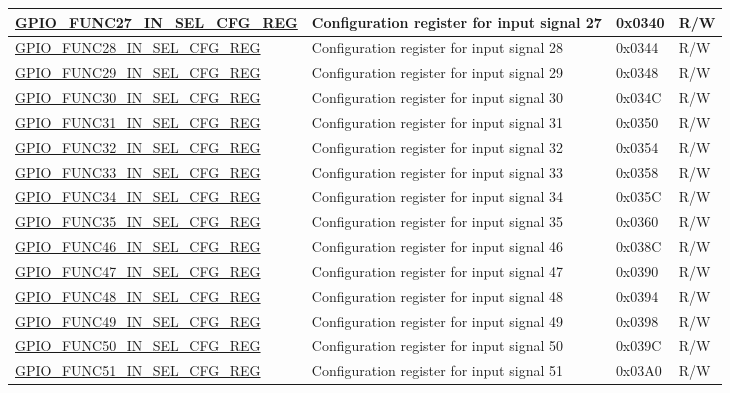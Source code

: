 \begin{longtable}{ | p{5.5cm} | p{7cm} | p{1.3cm} | p{1.9cm} | }
\hyperref[regdesc:GPIOFUNCPINSELCFGREG]{GPIO\_FUNC27\_IN\_SEL\_CFG\_REG} & Configuration register for input signal 27 & 0x0340 & R/W \\ \hline
\hyperref[regdesc:GPIOFUNCPINSELCFGREG]{GPIO\_FUNC28\_IN\_SEL\_CFG\_REG} & Configuration register for input signal 28 & 0x0344 & R/W \\ \hline
\hyperref[regdesc:GPIOFUNCPINSELCFGREG]{GPIO\_FUNC29\_IN\_SEL\_CFG\_REG} & Configuration register for input signal 29 & 0x0348 & R/W \\ \hline
\hyperref[regdesc:GPIOFUNCPINSELCFGREG]{GPIO\_FUNC30\_IN\_SEL\_CFG\_REG} & Configuration register for input signal 30 & 0x034C & R/W \\ \hline
\hyperref[regdesc:GPIOFUNCPINSELCFGREG]{GPIO\_FUNC31\_IN\_SEL\_CFG\_REG} & Configuration register for input signal 31 & 0x0350 & R/W \\ \hline
\hyperref[regdesc:GPIOFUNCPINSELCFGREG]{GPIO\_FUNC32\_IN\_SEL\_CFG\_REG} & Configuration register for input signal 32 & 0x0354 & R/W \\ \hline
\hyperref[regdesc:GPIOFUNCPINSELCFGREG]{GPIO\_FUNC33\_IN\_SEL\_CFG\_REG} & Configuration register for input signal 33 & 0x0358 & R/W \\ \hline
\hyperref[regdesc:GPIOFUNCPINSELCFGREG]{GPIO\_FUNC34\_IN\_SEL\_CFG\_REG} & Configuration register for input signal 34 & 0x035C & R/W \\ \hline
\hyperref[regdesc:GPIOFUNCPINSELCFGREG]{GPIO\_FUNC35\_IN\_SEL\_CFG\_REG} & Configuration register for input signal 35 & 0x0360 & R/W \\ \hline
\hyperref[regdesc:GPIOFUNCRINSELCFGREG]{GPIO\_FUNC46\_IN\_SEL\_CFG\_REG} & Configuration register for input signal 46 & 0x038C & R/W \\ \hline
\hyperref[regdesc:GPIOFUNCRINSELCFGREG]{GPIO\_FUNC47\_IN\_SEL\_CFG\_REG} & Configuration register for input signal 47 & 0x0390 & R/W \\ \hline
\hyperref[regdesc:GPIOFUNCRINSELCFGREG]{GPIO\_FUNC48\_IN\_SEL\_CFG\_REG} & Configuration register for input signal 48 & 0x0394 & R/W \\ \hline
\hyperref[regdesc:GPIOFUNCRINSELCFGREG]{GPIO\_FUNC49\_IN\_SEL\_CFG\_REG} & Configuration register for input signal 49 & 0x0398 & R/W \\ \hline
\hyperref[regdesc:GPIOFUNCRINSELCFGREG]{GPIO\_FUNC50\_IN\_SEL\_CFG\_REG} & Configuration register for input signal 50 & 0x039C & R/W \\ \hline
\hyperref[regdesc:GPIOFUNCRINSELCFGREG]{GPIO\_FUNC51\_IN\_SEL\_CFG\_REG} & Configuration register for input signal 51 & 0x03A0 & R/W \\ \hline

\end{longtable}
